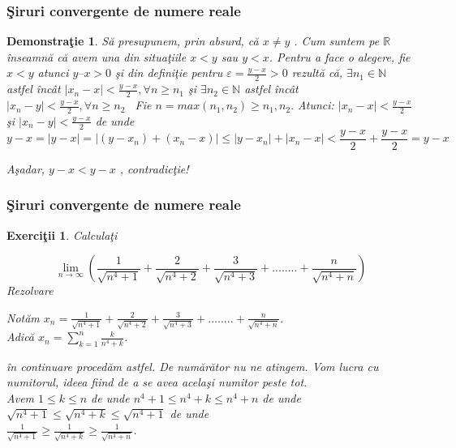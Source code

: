 \documentclass{beamer}
\theoremstyle{plain}
\newtheorem{ex}[de]{Exerci\c tii}
\newtheorem{dem}{Demonstra\c tie}
\begin{document}
\frame
{
\frametitle{\c Siruri convergente de numere reale}

\begin{dem}
S\u a presupunem, prin absurd, c\u a \(x \neq  y\) . Cum suntem pe \(\mathbb{R}\) \^ inseamn\u a c\u a avem una din situa\c tiile \(x < y\) sau \(y < x\). Pentru a face o alegere, fie \(x < y\) atunci \(y – x > 0\) \c si din defini\c tie pentru \(\varepsilon = \frac{y- x}{2}  > 0\) rezult\u a c\u a, 
\(\exists  n_{1} \in \mathbb{N}\) astfel \^ inc\^ at \(\left | x_{n} - x  \right | < \frac{y - x }{2} , \forall n \geq n_{1} \)
\c si 
\(\exists  n_{2} \in \mathbb{N}\) astfel \^ inc\^ at \(\left | x_{n} - y  \right | < \frac{y - x }{2} , \forall n \geq n_{2}\) 
Fie \(n = max (n _{1}, n_{2}) \geq n_{1}, n_{2}.\) Atunci: 
\(\left | x_{n} - x \right | < \frac{y-x}{2}\) \c si \(\left | x_{n} - y  \right | <  \frac{y-x}{2}\)
de unde 
\begin{displaymath}
  y-x = \left | y-x \right | = \left | (y-x_{n})+ (x_{n} -x) \right |\leq \left | y-x_{n} \right | + \left | x_{n} - x \right | < \frac{y-x}{2} + \frac{y-x}{2} = y-x
\end{displaymath}

	A\c sadar, \(y-x < y-x\) , contradic\c tie!
\end{dem}
}
\frame
{
\frametitle{\c Siruri convergente de numere reale}

\begin{ex}
Calcula\c ti 

\begin{displaymath}
  \lim_{n\to\infty }\left ( \frac{1}{\sqrt{n^{4}+1}}+ \frac{2}{\sqrt{n^{4}+2} } +\frac{3}{\sqrt{n^{4}+3}}+........+\frac{n}{\sqrt{n^{4}+n}}  \right )
\end{displaymath}
Rezolvare

Not\u am \(x_{n}= \frac{1}{\sqrt{n^{4}+1}} + \frac{2}{\sqrt{n^{4}+2}}+\frac{3}{\sqrt{n^{4}+3}}+........+\frac{n}{\sqrt{n^{4}+n}}\).
\\ Adic\u a \(x_{n}= \sum_{k=1}^{n}\frac{k}{n^{4}+k}\).

\^ in continuare proced\u am astfel. De num\u ar\u ator nu ne atingem. Vom lucra cu numitorul, ideea fiind de a se avea acela\c si numitor peste tot. 
\\ Avem \(1\leq k\leq n\) de unde \(n^{4}+1 \leq n^{4}+k \leq n^{4}+n\) de unde\\  \(\sqrt{n^{4}+1}\leq \sqrt{n^{4}+k}\leq \sqrt{n^{4}+1}\) de unde \\ \(\frac{1}{\sqrt{n^{4}+1}}\geq \frac{1}{\sqrt{n^{4}+k}}\geq \frac{1}{\sqrt{n^{4}+n}}\).
\end{ex}

}
\end{document}
